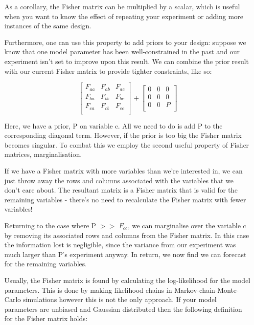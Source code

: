As a corollary, the Fisher matrix can be multiplied by a scalar, which is useful when you want to know the effect of repeating your experiment or adding more instances of the same design.

Furthermore, one can use this property to add priors to your design: suppose we know that one model parameter has been well-constrained in the past and our experiment isn't set to improve upon this result. We can combine the prior result with our current Fisher matrix to provide tighter constraints, like so:

$$ \begin{bmatrix}
F_{aa} & F_{ab} & F_{ac}\\  
F_{ba} & F_{bb} & F_{bc}\\   
F_{ca} & F_{cb} & F_{cc}\\
\end{bmatrix}
+
\begin{bmatrix}
0 & 0 & 0  \\
0 & 0 & 0   \\
0 & 0 & P\\
\end{bmatrix} $$

Here, we have a prior, P on variable c. All we need to do is add P to the corresponding diagonal term. However, if the prior is too big the Fisher matrix becomes singular. To combat this we employ the second useful property of Fisher matrices, marginalisation.

If we have a Fisher matrix with more variables than we're interested in, we can just throw away the rows and columns associated with the variables that we don't care about. The resultant matrix is a Fisher matrix that is valid for the remaining variables - there's no need to recalculate the Fisher matrix with fewer variables!

Returning to the case where P $>>$ $F_{cc}$, we can marginalise over the variable c by removing its associated rows and columns from the Fisher matrix. In this case the information lost is negligible, since the variance from our experiment was much larger than P's experiment anyway. In return, we now find we can forecast for the remaining variables.

Usually, the Fisher matrix is found by calculating the log-likelihood for the model parameters. This is done by making likelihood chains in Markov-chain-Monte-Carlo simulations however this is not the only approach. If your model parameters are unbiased and Gaussian distributed then the following definition for the Fisher matrix holds:

